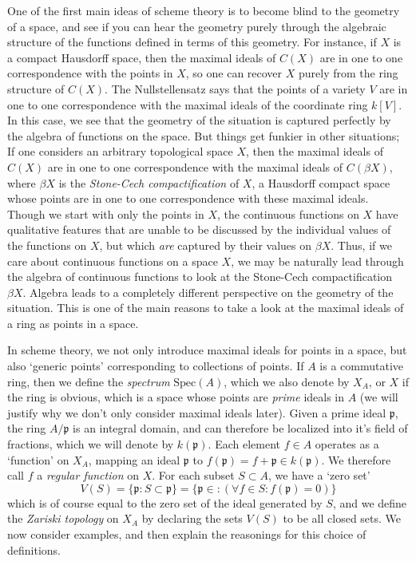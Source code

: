 One of the first main ideas of scheme theory is to become blind to the geometry of a space, and see if you can hear the geometry purely through the algebraic structure of the functions defined in terms of this geometry. For instance, if $X$ is a compact Hausdorff space, then the maximal ideals of $C(X)$ are in one to one correspondence with the points in $X$, so one can recover $X$ purely from the ring structure of $C(X)$. The Nullstellensatz says that the points of a variety $V$ are in one to one correspondence with the maximal ideals of the coordinate ring $k[V]$. In this case, we see that the geometry of the situation is captured perfectly by the algebra of functions on the space. But things get funkier in other situations; If one considers an arbitrary topological space $X$, then the maximal ideals of $C(X)$ are in one to one correspondence with the maximal ideals of $C(\beta X)$, where $\beta X$ is the {\it Stone-Cech compactification} of $X$, a Hausdorff compact space whose points are in one to one correspondence with these maximal ideals. Though we start with only the points in $X$, the continuous functions on $X$ have qualitative features that are unable to be discussed by the individual values of the functions on $X$, but which {\it are} captured by their values on $\beta X$. Thus, if we care about continuous functions on a space $X$, we may be naturally lead through the algebra of continuous functions to look at the Stone-Cech compactification $\beta X$. Algebra leads to a completely different perspective on the geometry of the situation. This is one of the main reasons to take a look at the maximal ideals of a ring as points in a space.

In scheme theory, we not only introduce maximal ideals for points in a space, but also `generic points' corresponding to collections of points. If $A$ is a commutative ring, then we define the \emph{spectrum} $\text{Spec}(A)$, which we also denote by $X_A$, or $X$ if the ring is obvious, which is a space whose points are {\it prime} ideals in $A$ (we will justify why we don't only consider maximal ideals later). Given a prime ideal $\mathfrak{p}$, the ring $A/\mathfrak{p}$ is an integral domain, and can therefore be localized into it's field of fractions, which we will denote by $k(\mathfrak{p})$. Each element $f \in A$ operates as a `function' on $X_A$, mapping an ideal $\mathfrak{p}$ to $f(\mathfrak{p}) = f + \mathfrak{p} \in k(\mathfrak{p})$. We therefore call $f$ a \emph{regular function} on $X$. For each subset $S \subset A$, we have a `zero set'
%
\[ V(S) = \{ \mathfrak{p}: S \subset \mathfrak{p} \} = \{ \mathfrak{p} \in : (\forall f \in S: f(\mathfrak{p}) = 0) \} \]
%
which is of course equal to the zero set of the ideal generated by $S$, and we define the \emph{Zariski topology} on $X_A$ by declaring the sets $V(S)$ to be all closed sets. We now consider examples, and then explain the reasonings for this choice of definitions.

